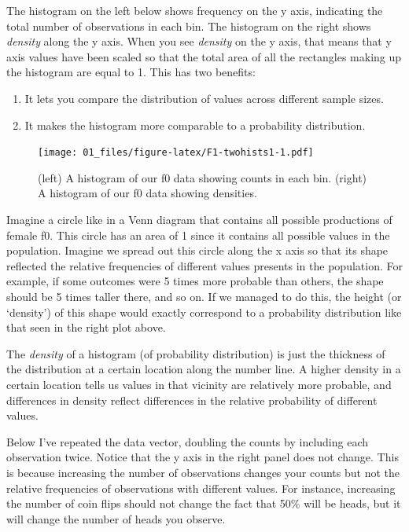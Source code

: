 \documentclass[
]{book}
\providecommand{\tightlist}{%
  \setlength{\itemsep}{0pt}\setlength{\parskip}{0pt}}
\begin{document}
The histogram on the left below shows frequency on the y axis, indicating the total number of observations in each bin. The histogram on the right shows \emph{density} along the y axis. When you see \emph{density} on the y axis, that means that y axis values have been scaled so that the total area of all the rectangles making up the histogram are equal to 1. This has two benefits:

\begin{enumerate}
\def\labelenumi{\arabic{enumi})}
\tightlist
\item
  It lets you compare the distribution of values across different sample sizes.
\item
  It makes the histogram more comparable to a probability distribution.
\end{enumerate}

\begin{figure}
\centering
\texttt{[image: 01\_files/figure-latex/F1-twohists1-1.pdf]}
\caption{\label{fig:F1-twohists1}(left) A histogram of our f0 data showing counts in each bin. (right) A histogram of our f0 data showing densities.}
\end{figure}

Imagine a circle like in a Venn diagram that contains all possible productions of female f0. This circle has an area of 1 since it contains all possible values in the population. Imagine we spread out this circle along the x axis so that its shape reflected the relative frequencies of different values presents in the population. For example, if some outcomes were 5 times more probable than others, the shape should be 5 times taller there, and so on. If we managed to do this, the height (or `density') of this shape would exactly correspond to a probability distribution like that seen in the right plot above.

The \emph{density} of a histogram (of probability distribution) is just the thickness of the distribution at a certain location along the number line. A higher density in a certain location tells us values in that vicinity are relatively more probable, and differences in density reflect differences in the relative probability of different values.

Below I've repeated the data vector, doubling the counts by including each observation twice. Notice that the y axis in the right panel does not change. This is because increasing the number of observations changes your counts but not the relative frequencies of observations with different values. For instance, increasing the number of coin flips should not change the fact that 50\% will be heads, but it will change the number of heads you observe.
\end{document}
